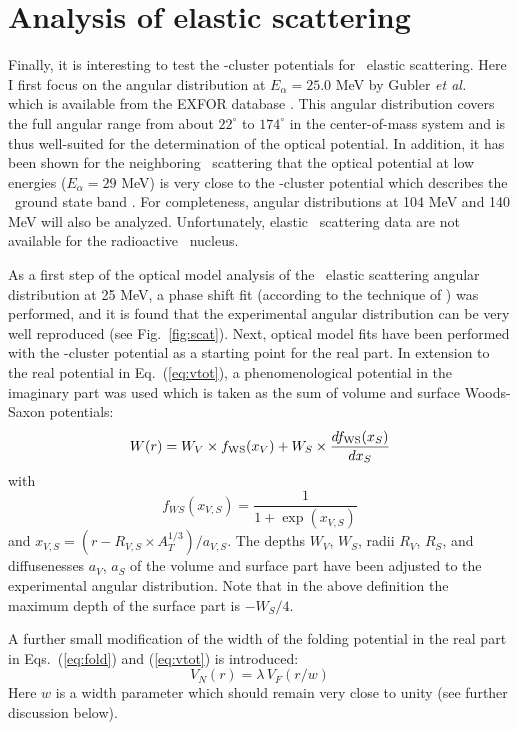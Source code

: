 \section{Analysis of elastic scattering}
\label{sec:elast}
%
Finally, it is interesting to test the \al -cluster potentials for \tinull \raa
\tinull\ elastic scattering. Here I first focus on the angular distribution at
$E_\alpha = 25.0$ MeV by Gubler {\it et al.}\ \cite{Gub81} which is available
from the EXFOR database \cite{EXFOR}. This angular distribution covers the
full angular range from about $22^\circ$ to $174^\circ$ in the center-of-mass
system and is thus well-suited for the determination of the optical
potential. In addition, it has been shown for the neighboring \canull \raa
\canull\ scattering that the optical potential at low energies ($E_\alpha = 29$
MeV) is very close to the \al -cluster potential which describes the
\tiiv\ ground state band \cite{Atz96}. For completeness, angular distributions
at 104 MeV \cite{Pesl83} and 140 MeV \cite{Rob78} will also be
analyzed. Unfortunately, elastic \raa\ scattering data are not available for
the radioactive \tiii\ nucleus.

As a first step of the optical model analysis of the \tinull \raa
\tinull\ elastic scattering angular distribution at 25 MeV, a phase shift fit
(according to the technique of \cite{Chi96}) was performed, and it is found
that the experimental angular distribution can be very well reproduced (see
Fig.~\ref{fig:scat}). Next, optical model fits have been performed with the
\al -cluster potential as a starting point for the real part. In extension to
the real potential in Eq.~(\ref{eq:vtot}), a phenomenological potential in the
imaginary part was used which is taken as the sum of volume and surface
Woods-Saxon potentials:
%
\begin{equation}
W(r) = W_V \times f_{\rm{WS}}(x_V) + W_S \times \frac{df_{\rm{WS}}(x_S)}{dx_S}
\label{eq:imag}
\end{equation}
%
with
%
\begin{equation}
f_{WS}(x_{V,S}) = \frac{1}{1+\exp{(x_{V,S})}}
\label{eq:WS}
\end{equation}
%
and $x_{V,S} = (r-R_{V,S} \times A_T^{1/3})/a_{V,S}$. The depths $W_V$, $W_S$,
radii $R_V$, $R_S$, and diffusenesses $a_V$, $a_S$ of the volume and surface
part have been adjusted to the experimental angular distribution. Note that in
the above definition the maximum depth of the surface part is $-W_S/4$.
%

A further small modification of the width of the folding potential in the real
part in Eqs.~(\ref{eq:fold}) and (\ref{eq:vtot}) is introduced:
%
\begin{equation}
V_N(r) = \lambda \, V_F(r/w)
\label{eq:pot_real}
\end{equation}
%
Here $w$ is a width parameter which should remain very close to unity (see
further discussion below).

